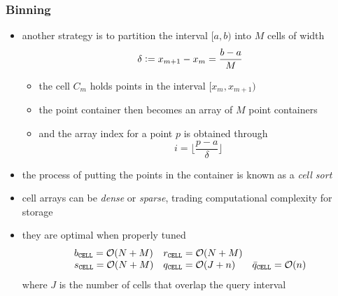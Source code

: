 \begin{frame}[fragile]
%
  \frametitle{Binning}
%
  \begin{itemize}
%
  \item another strategy is to partition the interval $[a,b)$ into $M$ cells of width
    \[
    \delta \mathrel{\mathop:}= x_{m+1} - x_{m} = \frac{b-a}{M}
    \]
    \begin{itemize}
    \item the  cell $C_{m}$ holds points in the interval $[x_{m}, x_{m+1})$
    \item the point container then becomes an array of $M$ point containers
    \item and the array index for a point $p$ is obtained through
      \[
      i = \lfloor \frac{p-a}{\delta} \rfloor
      \]
    \end{itemize}
%
  \item the process of putting the points in the container is known as a {\em cell sort}
%
  \item cell arrays can be {\em dense} or {\em sparse}, trading computational complexity for
    storage
  \item they are optimal when properly tuned
      \begin{equation*}
        \begin{array}{lll}
          b_{{\tt CELL}} = \mbox{$\mathcal{O}(N + M)$} &
          r_{{\tt CELL}} = \mbox{$\mathcal{O}(N + M)$} \\
          s_{{\tt CELL}} = \mbox{$\mathcal{O}(N + M)$} &
          q_{{\tt CELL}} = \mbox{$\mathcal{O}(J + n)$} &
          \bar{q}_{{\tt CELL}} = \mbox{$\mathcal{O}(n)$}
        \end{array}
      \end{equation*}
      where $J$ is the number of cells that overlap the query interval
%
  \end{itemize}
%
\end{frame}

